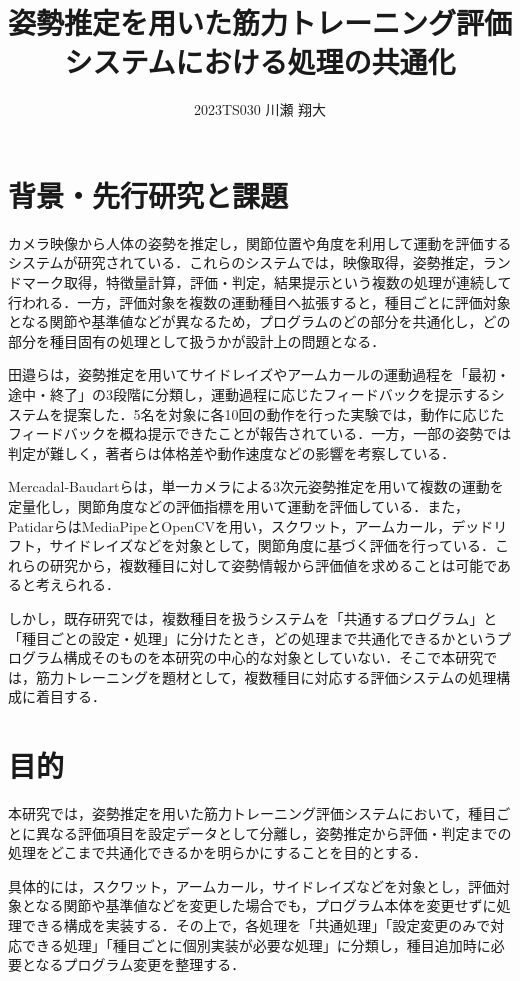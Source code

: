 \documentclass[no-page-number]{nanzan-abstract}
\title{姿勢推定を用いた筋力トレーニング評価システムにおける処理の共通化}
\author{2023TS030 川瀬 翔大}
\begin{document}
\maketitle

\section{背景・先行研究と課題}
カメラ映像から人体の姿勢を推定し，関節位置や角度を利用して運動を評価するシステムが研究されている．これらのシステムでは，映像取得，姿勢推定，ランドマーク取得，特徴量計算，評価・判定，結果提示という複数の処理が連続して行われる．一方，評価対象を複数の運動種目へ拡張すると，種目ごとに評価対象となる関節や基準値などが異なるため，プログラムのどの部分を共通化し，どの部分を種目固有の処理として扱うかが設計上の問題となる．

田邉らは，姿勢推定を用いてサイドレイズやアームカールの運動過程を「最初・途中・終了」の3段階に分類し，運動過程に応じたフィードバックを提示するシステムを提案した\cite{tanabe}．5名を対象に各10回の動作を行った実験では，動作に応じたフィードバックを概ね提示できたことが報告されている．一方，一部の姿勢では判定が難しく，著者らは体格差や動作速度などの影響を考察している\cite{tanabe}．

Mercadal-Baudartらは，単一カメラによる3次元姿勢推定を用いて複数の運動を定量化し，関節角度などの評価指標を用いて運動を評価している\cite{mercadal}．また，PatidarらはMediaPipeとOpenCVを用い，スクワット，アームカール，デッドリフト，サイドレイズなどを対象として，関節角度に基づく評価を行っている\cite{patidar}．これらの研究から，複数種目に対して姿勢情報から評価値を求めることは可能であると考えられる．

しかし，既存研究では，複数種目を扱うシステムを「共通するプログラム」と「種目ごとの設定・処理」に分けたとき，どの処理まで共通化できるかというプログラム構成そのものを本研究の中心的な対象としていない．そこで本研究では，筋力トレーニングを題材として，複数種目に対応する評価システムの処理構成に着目する．

\section{目的}
本研究では，姿勢推定を用いた筋力トレーニング評価システムにおいて，種目ごとに異なる評価項目を設定データとして分離し，姿勢推定から評価・判定までの処理をどこまで共通化できるかを明らかにすることを目的とする．

具体的には，スクワット，アームカール，サイドレイズなどを対象とし，評価対象となる関節や基準値などを変更した場合でも，プログラム本体を変更せずに処理できる構成を実装する．その上で，各処理を「共通処理」「設定変更のみで対応できる処理」「種目ごとに個別実装が必要な処理」に分類し，種目追加時に必要となるプログラム変更を整理する．
\end{document}
